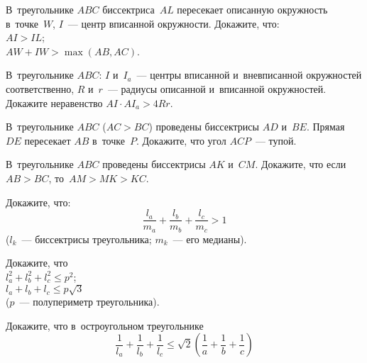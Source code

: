 



\begin{problems}

\item
В~треугольнике $ABC$ биссектриса~$AL$ пересекает описанную окружность
в~точке~$W$, $I$~--- центр вписанной окружности.
Докажите, что:
\\
\subproblem $AI > IL$;
\\
\subproblem $AW + IW > \max(AB, AC)$.

\item
В~треугольнике $ABC$: $I$ и~$I_{a}$~--- центры вписанной и~вневписанной
окружностей соответственно, $R$ и~$r$~--- радиусы описанной и~вписанной
окружностей.
Докажите неравенство $AI \cdot A I_{a} > 4 R r$.

\item
В~треугольнике $ABC$ ($AC > BC$) проведены биссектрисы $AD$ и~$BE$.
Прямая~$DE$ пересекает $AB$ в~точке~$P$.
Докажите, что угол $ACP$~--- тупой.

\item
В~треугольнике $ABC$ проведены биссектрисы $AK$ и~$CM$.
Докажите, что если $AB > BC$, то~$AM > MK > KC$.

\item
Докажите, что:
\[
    \frac{l_{a}}{m_{a}} + \frac{l_{b}}{m_{b}} + \frac{l_{c}}{m_{c}}
>
    1
\]
($l_{k}$~--- биссектрисы треугольника; $m_{k}$~--- его медианы).

\item
Докажите, что
\\
\subproblem
\(
    l_{a}^2 + l_{b}^2 + l_{c}^2
\leq
    p^2
\);
\\
\subproblem
\(
    l_{a} + l_{b} + l_{c}
\leq
    p \sqrt{3}
\)\\
($p$~--- полупериметр треугольника).

\item
Докажите, что в~остроугольном треугольнике
\[
    \frac{1}{l_{a}} + \frac{1}{l_{b}} + \frac{1}{l_{c}}
\leq
    \sqrt{2}
    \left( \frac{1}{a} + \frac{1}{b} + \frac{1}{c} \right)
\]


\end{problems}
